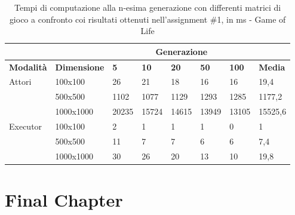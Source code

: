 \documentclass[12pt,a4paper,openright,oneside]{report}
\begin{document}
	\begin{table}[h]
		\centering
		\begin{tabular}{ll|lllll|l}
			\cline{3-7}
			&                    & \multicolumn{5}{c|}{\textbf{Generazione}} &                            \\ \hline
			\multicolumn{1}{|l|}{\textbf{Modalità}}       & \textbf{Dimensione} & \textbf{5} & \textbf{10} & \textbf{20} & \textbf{50} & \textbf{100}   & \multicolumn{1}{l|}{\textbf{Media}} \\ \hline
			
			\multicolumn{1}{|l|}{\multirow{3}{*}{Attori}} & 100x100            & 26    & 21    & 18    & 16    & 16    & \multicolumn{1}{l|}{19,4}      \\ \cline{2-2} \cline{8-8} 
			\multicolumn{1}{|l|}{}                        & 500x500            & 1102  & 1077  & 1129  & 1293  & 1285  & \multicolumn{1}{l|}{1177,2}      \\ \cline{2-2} \cline{8-8} 
			\multicolumn{1}{|l|}{}                        & 1000x1000          & 20235 & 15724 & 14615 & 13949 & 13105 & \multicolumn{1}{l|}{15525,6}      \\ \hline
			\multicolumn{1}{|l|}{\multirow{3}{*}{Executor}} & 100x100            & 2     & 1     & 1     & 1     & 0     & \multicolumn{1}{l|}{1}      \\ \cline{2-2} \cline{8-8} 
			\multicolumn{1}{|l|}{}                        & 500x500            & 11    & 7     & 7     & 6     & 6     & \multicolumn{1}{l|}{7,4}      \\ \cline{2-2} \cline{8-8} 
			\multicolumn{1}{|l|}{}                        & 1000x1000          & 30    & 26    & 20    & 13    & 10    & \multicolumn{1}{l|}{19,8}      \\ \hline
		\end{tabular}
		\caption{Tempi di computazione alla n-esima generazione con differenti
			matrici di gioco a confronto coi risultati ottenuti nell'assignment \#1, in ms - Game of Life}
		\label{table:gameoflife_tempi_celle}
	\end{table}
	
	\clearpage{\pagestyle{empty}\cleardoublepage}
	\chapter{Final Chapter}                %
	\lhead[\fancyplain{}{\bfseries\thepage}]{\fancyplain{}{\bfseries\rightmark}}
	
\end{document}
